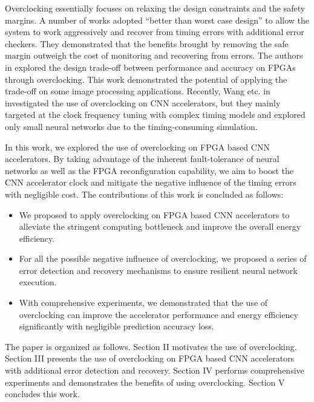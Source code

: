 Overclocking essentially focuses on relaxing the
design constraints and the safety margins. A number of works \cite{Razor} 
\cite{uht2004going} adopted “better than worst case design” to allow the system 
to work aggressively and recover from timing 
errors \cite{austin2005opportunities} with additional error checkers. 
They demonstrated that the benefits
brought by removing the safe margin outweigh the cost
of monitoring and recovering from errors. 
The authors in \cite{overclock_3} explored the design trade-off 
between performance and accuracy on FPGAs through overclocking. 
This work demonstrated the potential of applying the trade-off on 
some image processing applications. Recently, Wang etc. in 
\cite{wang2017resilience} investigated 
the use of overclocking on CNN accelerators, but they mainly targeted at 
the clock frequency tuning with complex timing models and explored 
only small neural networks due to the timing-consuming simulation.

In this work, we explored the use of overclocking on FPGA based 
CNN accelerators. By taking advantage of the inherent fault-tolerance 
of neural networks as well as the FPGA reconfiguration capability, we aim to 
boost the CNN accelerator clock and mitigate 
the negative influence of the timing errors with negligible cost. 
The contributions of this work is concluded as follows:

\begin{itemize}
	\item We proposed to apply overclocking on FPGA based CNN accelerators 
		to alleviate the stringent computing bottleneck and improve the 
		overall energy efficiency. 

	\item For all the possible negative influence of 
		overclocking, we proposed a series of error detection 
		and recovery mechanisms to ensure resilient neural network execution. 

	\item With comprehensive experiments, we demonstrated that the use 
		of overclocking can improve the accelerator performance and energy 
		efficiency significantly with negligible prediction accuracy loss.
\end{itemize}

The paper is organized as follows. Section II motivates the use of overclocking. 
Section III presents the use of overclocking on FPGA based CNN 
accelerators with additional error detection and recovery. 
Section IV performs comprehensive experiments and demonstrates the benefits 
of using overclocking. Section V concludes this work. 


